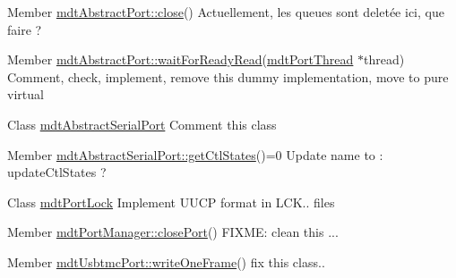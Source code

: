 \label{todo__todo000003}
\hypertarget{todo__todo000003}{}
 
\begin{DoxyDescription}
\item[Member \hyperlink{classmdt_abstract_port_a1ace1a2bd1a04f16952980e247b04800}{mdtAbstractPort::close}() ]Actuellement, les queues sont deletée ici, que faire ? 
\end{DoxyDescription}

\label{todo__todo000004}
\hypertarget{todo__todo000004}{}
 
\begin{DoxyDescription}
\item[Member \hyperlink{classmdt_abstract_port_a8a9177346624fb043689f1a5234fff4c}{mdtAbstractPort::waitForReadyRead}(\hyperlink{classmdt_port_thread}{mdtPortThread} $\ast$thread) ]Comment, check, implement, remove this dummy implementation, move to pure virtual 
\end{DoxyDescription}

\label{todo__todo000006}
\hypertarget{todo__todo000006}{}
 
\begin{DoxyDescription}
\item[Class \hyperlink{classmdt_abstract_serial_port}{mdtAbstractSerialPort} ]Comment this class 
\end{DoxyDescription}

\label{todo__todo000007}
\hypertarget{todo__todo000007}{}
 
\begin{DoxyDescription}
\item[Member \hyperlink{classmdt_abstract_serial_port_aaeacd26b220ab0f8c521cef74edfafdd}{mdtAbstractSerialPort::getCtlStates}()=0 ]Update name to : updateCtlStates ? 
\end{DoxyDescription}

\label{todo__todo000001}
\hypertarget{todo__todo000001}{}
 
\begin{DoxyDescription}
\item[Class \hyperlink{classmdt_port_lock}{mdtPortLock} ]Implement UUCP format in LCK.. files 
\end{DoxyDescription}

\label{todo__todo000005}
\hypertarget{todo__todo000005}{}
 
\begin{DoxyDescription}
\item[Member \hyperlink{classmdt_port_manager_ace8065f1f5083041ee7f65c2892bc77d}{mdtPortManager::closePort}() ]FIXME: clean this ... 
\end{DoxyDescription}

\label{todo__todo000002}
\hypertarget{todo__todo000002}{}
 
\begin{DoxyDescription}
\item[Member \hyperlink{classmdt_usbtmc_port_a97fca5f136f232275d90ab5b8c5ce285}{mdtUsbtmcPort::writeOneFrame}() ]fix this class.. 
\end{DoxyDescription}